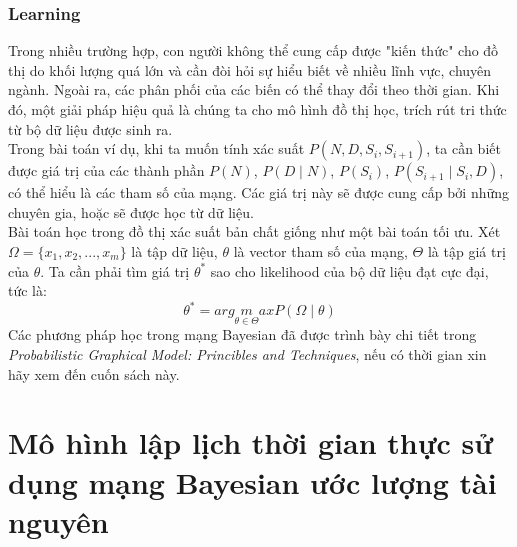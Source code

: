 \documentclass{my_style}
\begin{document}
\subsection{Learning}
Trong nhiều trường hợp, con người không thể cung cấp được "kiến thức" cho đồ thị do khối lượng quá lớn và cần đòi hỏi sự hiểu biết về nhiều lĩnh vực, chuyên ngành. Ngoài ra, các phân phối của các biến có thể thay đổi theo thời gian. Khi đó, một giải pháp hiệu quả là chúng ta cho mô hình đồ thị học, trích rút tri thức từ bộ dữ liệu được sinh ra. \\
Trong bài toán ví dụ, khi ta muốn tính xác suất $P(N, D, S_{i}, S_{i+1})$, ta cần biết được giá trị của các thành phần $P(N)$, $P(D \mid N)$, $P(S_{i})$, $P(S_{i+1} \mid S_{i}, D)$, có thể hiểu là các tham số của mạng. Các giá trị này sẽ được cung cấp bởi những chuyên gia, hoặc sẽ được học từ dữ liệu.\\
Bài toán học trong đồ thị xác suất bản chất giống như một bài toán tối ưu. Xét $\Omega = \{x_{1}, x_{2}, ..., x_{m}\}$ là tập dữ liệu, $\theta$ là vector tham số của mạng, $\Theta$ là tập giá trị của $\theta$. Ta cần phải tìm giá trị $\theta^{*}$ sao cho likelihood của bộ dữ liệu đạt cực đại, tức là: 
\begin{equation}
	\theta^{*} = arg\underset{\theta \in \Theta}maxP(\Omega \mid \theta)
\end{equation}
Các phương pháp học trong mạng Bayesian đã được trình bày chi tiết trong \textit{Probabilistic Graphical Model: Princibles and Techniques}\cite{28}, nếu có thời gian xin hãy xem đến cuốn sách này. 

\newpage
\chapter{Mô hình lập lịch thời gian thực sử dụng mạng Bayesian ước lượng tài nguyên}
\label{Scheduling_model}
\end{document}
